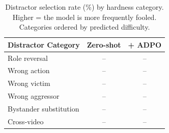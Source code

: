 \begin{table}[t]
\centering
\caption{Distractor selection rate (\%) by hardness category.
Higher = the model is more frequently fooled. Categories ordered by
predicted difficulty.}
\label{tab:hardness_errors}
\small
\begin{tabular}{lcc}
\toprule
Distractor Category & Zero-shot & + ADPO \\
\midrule
Role reversal             & -- & -- \\
Wrong action              & -- & -- \\
Wrong victim              & -- & -- \\
Wrong aggressor           & -- & -- \\
Bystander substitution    & -- & -- \\
Cross-video               & -- & -- \\
\bottomrule
\end{tabular}
\end{table}




